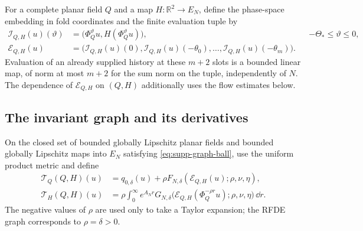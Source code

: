 For a complete planar field \(Q\) and a map \(H:\mathbb R^2\to E_N\),
define the phase-space embedding in fold coordinates and the finite
evaluation tuple by
\begin{align}
 \mathcal I_{Q,H}(u)(\vartheta)
 &=\bigl(\Phi_Q^\vartheta u,H(\Phi_Q^\vartheta u)\bigr),
 &&-\Theta_*\le\vartheta\le0,
 \label{eq:supp-history-lift}\\
 \mathcal E_{Q,H}(u)
 &=\bigl(\mathcal I_{Q,H}(u)(0),
          \mathcal I_{Q,H}(u)(-\theta_0),\ldots,
          \mathcal I_{Q,H}(u)(-\theta_m)\bigr).
 \label{eq:supp-history-evaluation}
\end{align}
Evaluation of an already supplied history at these \(m+2\) slots is a
bounded linear map, of norm at most \(m+2\) for the sum norm on the tuple,
independently of \(N\).  The dependence of \(\mathcal E_{Q,H}\) on
\((Q,H)\) additionally uses the flow estimates below.

\subsection{The invariant graph and its derivatives}

On the closed set of bounded globally Lipschitz planar fields and bounded
globally Lipschitz maps into \(E_N\) satisfying
\cref{eq:supp-graph-ball}, use the uniform product metric and define
\begin{align}
 \mathcal T_Q(Q,H)(u)
 &=q_{0,\delta}(u)+\rho F_{N,\delta}
       (\mathcal E_{Q,H}(u);\rho,\nu,\eta),
 \label{eq:supp-graph-transform-Q}\\
 \mathcal T_H(Q,H)(u)
 &=\rho\int_0^\infty e^{A_Nr}G_{N,\delta}
       \bigl(\mathcal E_{Q,H}(\Phi_Q^{-\rho r}u);
              \rho,\nu,\eta\bigr)\,\dd r.
 \label{eq:supp-graph-transform-H}
\end{align}
The negative values of \(\rho\) are used only to take a Taylor expansion;
the RFDE graph corresponds to \(\rho=\delta>0\).

